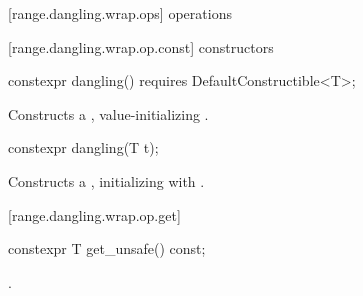 {[range.dangling.wrap.ops]{ operations}

[range.dangling.wrap.op.const]{ constructors}

%
\begin{itemdecl}
constexpr dangling() requires DefaultConstructible<T>;
\end{itemdecl}

\begin{itemdescr}
\pnum
\effects Constructs a , value-initializing .
\end{itemdescr}

%
\begin{itemdecl}
constexpr dangling(T t);
\end{itemdecl}

\begin{itemdescr}
\pnum
\effects Constructs a , initializing  with .
\end{itemdescr}

[range.dangling.wrap.op.get]{}

%
%
\begin{itemdecl}
constexpr T get_unsafe() const;
\end{itemdecl}

\begin{itemdescr}
\pnum
\returns {}.
\end{itemdescr}


} %
